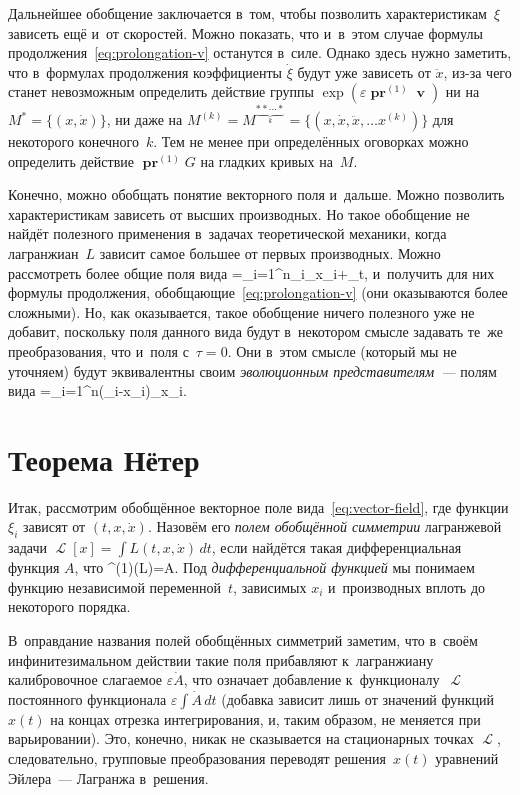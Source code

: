 \documentclass[a4paper,11pt]{article}
\def\[#1\]{\begin{align*}#1\end{align*}}
\newcommand\eqtag[1]{\refstepcounter{equation}\tag{\theequation}\label{#1}}
\theoremstyle{definition}
\begin{document}
Дальнейшее обобщение заключается в~том, чтобы позволить характеристикам~$\xi$
зависеть ещё и~от скоростей. Можно показать, что и~в~этом случае формулы
продолжения~\eqref{eq:prolongation-v} останутся в~силе. Однако здесь нужно
заметить, что в~формулах продолжения коэффициенты $\dot\xi$ будут уже зависеть
от $\ddot x$, из-за чего станет невозможным определить действие группы
$\exp(\varepsilon\operatorname{\symbf{pr}}^{(1)}\mbfv)$ ни на $M^*=\{(x,\dot
x)\}$, ни даже на $M^{(k)}=M^{\underbrace{**\cdots*}_k}=\{(x,\dot x,\ddot
x,\ldots x^{(k)})\}$ для некоторого конечного~$k$. Тем не менее при
определённых оговорках можно определить действие
$\operatorname{\symbf{pr}}^{(1)}G$ на гладких кривых на~$M$.

Конечно, можно обобщать понятие векторного поля и~дальше. Можно позволить
характеристикам зависеть от высших производных. Но такое обобщение не найдёт
полезного применения в~задачах теоретической механики, когда лагранжиан~$L$
зависит самое большее от первых производных. Можно рассмотреть более общие поля
вида
	\[
	\mbfv=\sum_{i=1}^n\xi_i\partial_{x_i}+\tau\partial_t,
	\]
и~получить для них формулы продолжения, обобщающие~\eqref{eq:prolongation-v}
(они оказываются более сложными). Но, как оказывается, такое обобщение ничего
полезного уже не добавит, поскольку поля данного вида будут в~некотором смысле
задавать те~же преобразования, что и~поля с~$\tau=0$. Они в~этом смысле
(который мы не уточняем) будут эквивалентны своим \emph{эволюционным
представителям~—\/} полям вида
	\[
	\tilde\mbfv=\sum_{i=1}^n(\xi_i-\tau\dot x_i)\partial_{x_i}.
	\]

\section{Теорема Нётер}

Итак, рассмотрим обобщённое векторное поле вида~\eqref{eq:vector-field}, где
функции $\xi_i$ зависят от $(t,x,\dot x)$. Назовём его \emph{полем обобщённой
симметрии\/} лагранжевой задачи $\mscrL[x]=\int L(t,x,\dot x)\,dt$, если
найдётся такая дифференциальная функция $A$, что
	\[
	\operatorname{\symbf{pr}}^{(1)}\mbfv(L)=\dot A.
	\eqtag{eq:symmetry-cond}
	\]
Под \emph{дифференциальной функцией\/} мы понимаем функцию независимой
переменной~$t$, зависимых $x_i$ и~производных вплоть до некоторого порядка.

В~оправдание названия полей обобщённых симметрий заметим, что в~своём
инфинитезимальном действии такие поля прибавляют к~лагранжиану калибровочное
слагаемое $\varepsilon\dot A$, что означает добавление к~функционалу~$\mscrL$
постоянного функционала $\varepsilon\int\dot A\,dt$ (добавка зависит лишь от
значений функций $x(t)$ на концах отрезка интегрирования, и, таким образом, не
меняется при варьировании). Это, конечно, никак не сказывается на стационарных
точках $\mscrL$, следовательно, групповые преобразования переводят
решения~$x(t)$ уравнений Эйлера~— Лагранжа в~решения.
\end{document}
